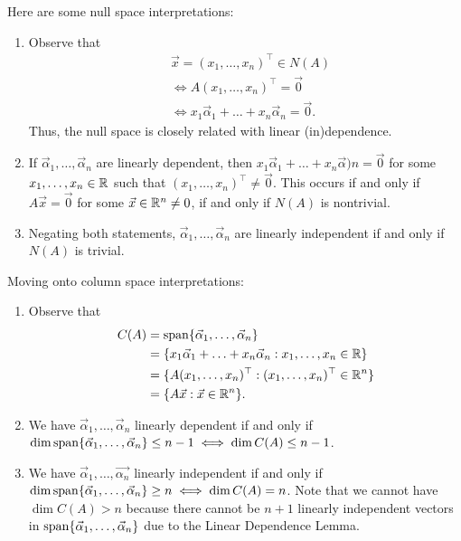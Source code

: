 \documentclass[main.tex]{subfiles}
\begin{document}
Here are some null space interpretations:
\begin{enumerate}
    \item Observe that 
    \begin{align*}
        &\vec{x} = (x_1, \ldots , x_n)^\top \in N(A) \\
        &\iff A(x_1, \ldots , x_n)^\top = \vec{0} \\
        &\iff x_1\vec{\alpha}_1 + \ldots + x_n\vec{\alpha}_n = \vec{0}.
    \end{align*}
    Thus, the null space is closely related with linear (in)dependence.
    \item If $\vec{\alpha}_1, \ldots , \vec{\alpha}_n$ are linearly dependent, then $x_1\vec{\alpha}_1 + \ldots + x_n\vec{\alpha})n = \vec{0}$ for some $x_1, \ldots , x_n\in \mathbb R$ such that $(x_1, \ldots , x_n)^\top \neq \vec{0}$. This occurs if and only if $A\vec{x} = \vec{0}$ for some $\vec{x}\in \mathbb R^n\neq 0$, if and only if $N(A)$ is nontrivial.
    \item Negating both statements, $\vec{\alpha}_1, \ldots , \vec{\alpha}_n$ are linearly independent if and only if $N(A)$ is trivial.
\end{enumerate}
Moving onto column space interpretations:
\begin{enumerate}
    \item Observe that
    \begin{align*}
        C(A) &= \operatorname{span}\{\vec{\alpha}_1, \ldots , \vec{\alpha}_n\} \\
        &= \{x_1\vec{\alpha}_1 + \ldots + x_n\vec{\alpha}_n : x_1, \ldots , x_n\in \mathbb R\} \\
        &= \{A(x_1, \ldots , x_n)^\top : (x_1, \ldots , x_n)^\top \in \mathbb R^n\} \\
        &= \{A\vec{x} : \vec{x}\in \mathbb R^n\}.
    \end{align*}
    \item We have $\vec{\alpha}_1, \ldots , \vec{\alpha}_n$ linearly dependent if and only if $\dim\operatorname{span}\{\vec{\alpha}_1, \ldots , \vec{\alpha}_n\} \le n - 1 \iff \dim C(A) \le n - 1$.
    \item We have $\vec{\alpha}_1 , \ldots , \vec{\alpha_n}$ linearly independent if and only if $\dim \operatorname{span}\{\vec{\alpha}_1, \ldots , \vec{\alpha}_n\}\ge n\iff \dim C(A) = n$. Note that we cannot have $\dim C(A) > n$ because there cannot be $n + 1$ linearly independent vectors in $\operatorname{span}\{\vec{\alpha}_1, \ldots , \vec{\alpha}_n\}$ due to the Linear Dependence Lemma.
\end{enumerate}
\end{document}
